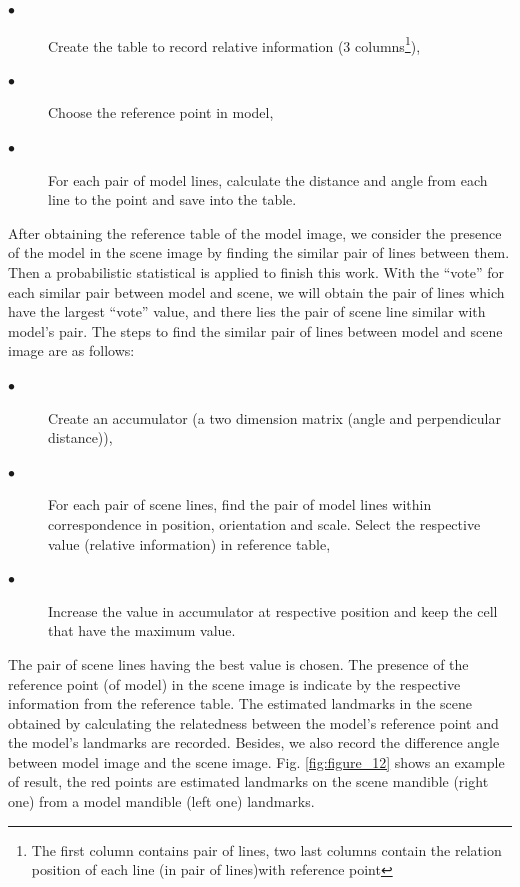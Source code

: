 \documentclass[twoside,twocolumn,10pt]{article}
\begin{document}
{\small{
	\begin{description}
		\item[$\bullet$] Create the table to record relative information (3 columns\footnote{The first column contains pair of lines, two last columns contain the relation position of each line (in pair of lines)with reference point}),
		\item[$\bullet$] Choose the reference point in model,
		\item[$\bullet$] For each pair of model lines, calculate the distance and angle from each line to the point and save into the table.
	\end{description}
}}
After obtaining the reference table of the model image, we consider the presence of the model in the scene image by finding the similar pair of lines between them. Then a probabilistic statistical is applied to finish this work. With the ``vote'' for each similar pair between model and scene, we will obtain the pair of lines which have the largest ``vote'' value, and there lies the pair of scene line similar with model's pair. The steps to find the similar pair of lines between model and scene image are as follows:
{\small{
\begin{description}
	\item[$\bullet$] Create an accumulator (a two dimension matrix (angle and perpendicular distance)),
	\item[$\bullet$] For each pair of scene lines, find the pair of model lines within correspondence in position, orientation and scale. Select the respective value (relative information) in reference table,
	\item[$\bullet$] Increase the value in accumulator at respective position and keep the cell that have the maximum value.
\end{description}
}}
The pair of scene lines having the best value is chosen. The presence of the reference point (of model) in the scene\cite{ashbrook1995robust} image is indicate by the respective information from the reference table. The estimated landmarks in the scene obtained by calculating the relatedness between
the model's reference point and the model's landmarks are
recorded. Besides, we also record the difference angle between model
image and the scene image. Fig. \ref{fig:figure_12} shows an example
of result, the red points are estimated landmarks on the scene mandible
(right one) from a model mandible (left one) landmarks. 
\end{document}
